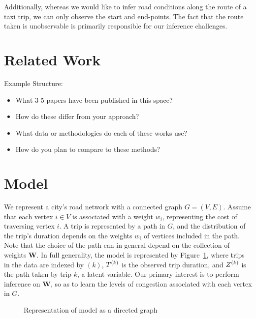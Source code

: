 \documentclass{article}
\begin{document}
Additionally, whereas we would like to infer road conditions along the route of
a taxi trip, we can only observe the start and end-points. The fact that the
route taken is unobservable is primarily responsible for our inference
challenges.


\section{Related Work}

Example Structure:
\begin{itemize}
\item What 3-5 papers have been published in this space?
\item How do these  differ from your approach?
\item What data or methodologies do each of these works use?
\item How do you plan to compare to these methods?
\end{itemize}




\section{Model}

We represent a city's road network with a connected graph $G = (V,E)$. Assume that each vertex $i \in V$ is associated with a weight $w_i$, representing the cost of traversing vertex $i$. A trip is represented by a path in $G$, and the distribution of the trip's duration depends on the weights $w_i$ of vertices included in the path. Note that the choice of the path can in general depend on the collection of weights $\bm W$. In full generality, the model is represented by Figure~\ref{fig:dgm}, where trips in the data are indexed by $(k)$, $T^{(k)}$ is the observed trip duration, and $Z^{(k)}$ is the path taken by trip $k$, a latent variable. Our primary interest is to perform inference on $\bm W$, so as to learn the levels of congestion associated with each vertex in $G$. 

\begin{figure}[h]
  \centering
  \caption{Representation of model as a directed graph}
  \label{fig:dgm}
  \vspace{1em}
\end{figure}
\end{document}

